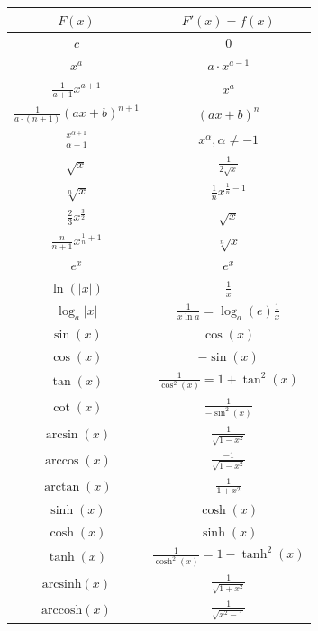 \begin{center}
        \begin{tabular}{c||c}
                $F(x)$ & $F'(x) = f(x)$ \\
                \hline \hline
                
                $ c $ & $ 0 $ \\
	        $ x^a $ & $ a \cdot x^{a - 1} $ \\
                $ \frac{1}{a+1} x^{a+1} $ & $ x^a $ \\
                $ \frac{1}{a\cdot(n+1)} (ax+b)^{n+1} $ & $ (ax+b)^n $ \\
	        $ \frac{x^{\alpha+1}}{\alpha + 1} $ & $ x^\alpha, \alpha \neq -1 $ \\
                $ \sqrt x $ & $ \frac{1}{2 \sqrt x} $ \\
                $ \sqrt[n] x $ & $ \frac{1}{n} {x}^{ \frac{1}{n} -1 } $ \\
                $ \frac{2}{3} x^{ \frac{3}{2} } $ & $ \sqrt x $ \\
                $ \frac{n}{n+1} x^{ \frac{1}{n}+1 } $ & $ \sqrt[n] x $ \\
	        $ e^x $ & $ e^x $ \\
	        $ \ln(|x|) $ & $ \frac{1}{x} $ \\
                $ \log_a |x| $  &  $ \frac{1}{x \ln a} = \log_a(e) \frac{1}{x} $ \\
	        $ \sin(x) $ & $ \cos(x) $ \\
	        $ \cos(x) $ & $ -\sin(x) $ \\
	        $ \tan(x) $ & $ \frac{1}{\cos^2(x)} = 1 + \tan^2(x) $ \\
	        $ \cot(x) $ & $ \frac{1}{-\sin^2(x)} $ \\
	        $ \arcsin(x) $ & $ \frac{1}{\sqrt{1 - x^2}} $ \\
	        $ \arccos(x) $ & $ \frac{-1}{\sqrt{1 - x^2}} $ \\
	        $ \arctan(x) $ & $ \frac{1}{1 + x^2} $ \\
	        $ \sinh(x) $ & $ \cosh(x) $ \\
	        $ \cosh(x) $ & $ \sinh(x) $ \\
                $ \tanh(x) $ & $ \frac{1}{\cosh^2(x)} = 1 - \tanh^2(x) $ \\
	        $ \text{arcsinh}(x) $ & $ \frac{1}{\sqrt{1 + x^2}} $ \\
	        $ \text{arccosh}(x) $ & $ \frac{1}{\sqrt{x^2 - 1}} $ \\

\end{tabular}
\end{center}

